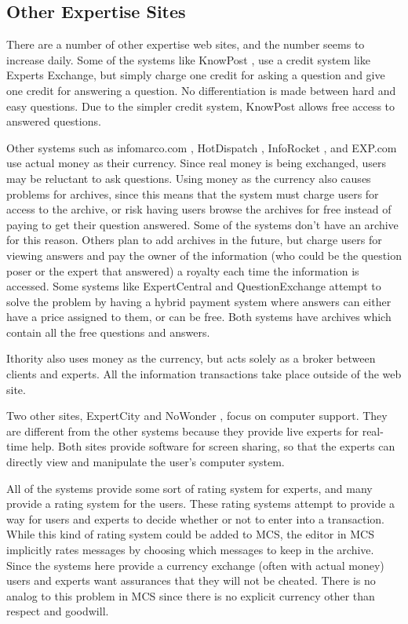 \subsection{Other Expertise Sites}
There are a number of other expertise web sites, and the number seems to
increase daily. Some of the systems like KnowPost \cite{knowpost-website}, use
a credit system like Experts Exchange, but simply charge one credit for asking
a question and give one credit for answering a question. No differentiation is
made between hard and easy questions. Due to the simpler credit system,
KnowPost allows free access to answered questions.

Other systems such as infomarco.com \cite{infomarco-website}, HotDispatch
\cite{hotdispatch-website}, InfoRocket \cite{inforocket-website}, and
\linebreak[4]EXP.com \cite{exp-website} use actual money as their currency.
Since real money is being exchanged, users may be reluctant to ask questions.
Using money as the currency also causes problems for archives, since this means
that the system must charge users for access to the archive, or risk having
users browse the archives for free instead of paying to get their question
answered. Some of the systems don't have an archive for this reason. Others
plan to add archives in the future, but charge users for viewing answers and
pay the owner of the information (who could be the question poser or the expert
that answered) a royalty each time the information is accessed. Some systems
like ExpertCentral \cite{expertcentral-website} and QuestionExchange
\cite{questionexchange-website} attempt to solve the problem by having a hybrid
payment system where answers can either have a price assigned to them, or can
be free. Both systems have archives which contain all the free questions and
answers.

Ithority \cite{ithority-website} also uses money as the currency, but acts
solely as a broker between clients and experts. All the information
transactions take place outside of the web site.

Two other sites, ExpertCity \cite{expertcity-website} and NoWonder
\cite{nowonder-website}, focus on computer support. They are different from the
other systems because they provide live experts for real-time help. Both sites
provide software for screen sharing, so that the experts can directly view and
manipulate the user's computer system.

All of the systems provide some sort of rating system for experts, and many
provide a rating system for the users. These rating systems attempt to provide
a way for users and experts to decide whether or not to enter into a
transaction. While this kind of rating system could be added to MCS, the editor
in MCS implicitly rates messages by choosing which messages to keep in the
archive. Since the systems here provide a currency exchange (often with actual
money) users and experts want assurances that they will not be cheated. There
is no analog to this problem in MCS since there is no explicit currency other
than respect and goodwill.

